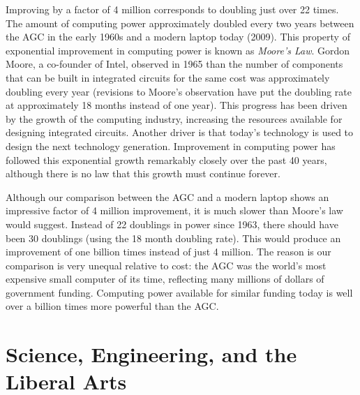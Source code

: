 Improving by a factor of 4 million corresponds to doubling just over 22 times.  The amount of computing power approximately doubled every two years between the AGC in the early 1960s and a modern laptop today (2009).  This property of exponential improvement in computing power is known as \emph{Moore's Law}.  Gordon Moore, a co-founder of Intel, observed in 1965 than the number of components that can be built in integrated circuits for the same cost was approximately doubling every year (revisions to Moore's observation have put the doubling rate at approximately 18 months instead of one year). This progress has been driven by the growth of the computing industry, increasing the resources available for designing integrated circuits.  Another driver is that today's technology is used to design the next technology generation.  Improvement in computing power has followed this exponential growth remarkably closely over the past 40 years, although there is no law that this growth must continue forever.  

Although our comparison between the AGC and a modern laptop shows an impressive factor of 4 million improvement, it is much slower than Moore's law would suggest.  Instead of 22 doublings in power since 1963, there should have been 30 doublings (using the 18 month doubling rate).  This would produce an improvement of one billion times instead of just 4 million.  The reason is our comparison is very unequal relative to cost: the AGC was the world's most expensive small computer of its time, reflecting many millions of dollars of government funding.  Computing power available for similar funding today is well over a billion times more powerful than the AGC.



%


\section{Science, Engineering, and the Liberal Arts}

